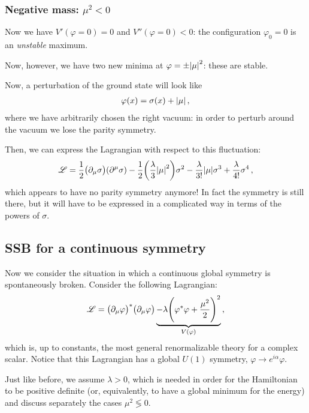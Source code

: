 \documentclass[main.tex]{subfiles}
\begin{document}
\subsubsection{Negative mass: \(\mu^2 <0\)}

Now we have \(V'(\varphi =0) = 0\) and \(V'' (\varphi=0) < 0\): the configuration \(\varphi_0 = 0\) is an \emph{unstable} maximum. 

Now, however, we have two new minima at \(\varphi = \pm \abs{\mu }^2\): these are stable.

Now, a perturbation of the ground state will look like 
%
\begin{align}
\varphi (x) = \sigma (x) + \abs{\mu }
\,,
\end{align}
%
where we have arbitrarily chosen the right vacuum: in order to perturb around the vacuum we lose the parity symmetry. 

Then, we can express the Lagrangian with respect to this fluctuation: 
%
\begin{align}
\mathscr{L} = \frac{1}{2} \qty(\partial_{\mu }\sigma ) \qty(\partial^{\mu }\sigma ) - \frac{1}{2} \qty(\frac{\lambda }{3} \abs{\mu }^2)\sigma^2 - \frac{\lambda}{3!} \abs{\mu } \sigma^3 + \frac{\lambda}{4!} \sigma^{4}
\,,
\end{align}
%
which appears to have no parity symmetry anymore! 
In fact the symmetry is still there, but it will have to be expressed in a complicated way in terms of the powers of \(\sigma \). 

\subsection{SSB for a continuous symmetry}

Now we consider the situation in which a continuous global symmetry is spontaneously broken. Consider the following Lagrangian: 
%
\begin{align}
\mathscr{L} = \qty(\partial_{\mu }\varphi )^{*} \qty(\partial_{\mu } \varphi ) \underbrace{- \lambda \qty(\varphi^{*} \varphi + \frac{\mu^2}{2})^2}_{V(\varphi )}
\,,
\end{align}
%
which is, up to constants, the most general renormalizable theory for a complex scalar.
Notice that this Lagrangian has a global \(U(1)\) symmetry, \(\varphi \to e^{i \alpha } \varphi \). 

Just like before, we assume \(\lambda > 0\), which is needed in order for the Hamiltonian to be positive definite (or, equivalently, to have a global minimum for the energy) and discuss separately the cases \(\mu^2 \lessgtr 0\). 
\end{document}
